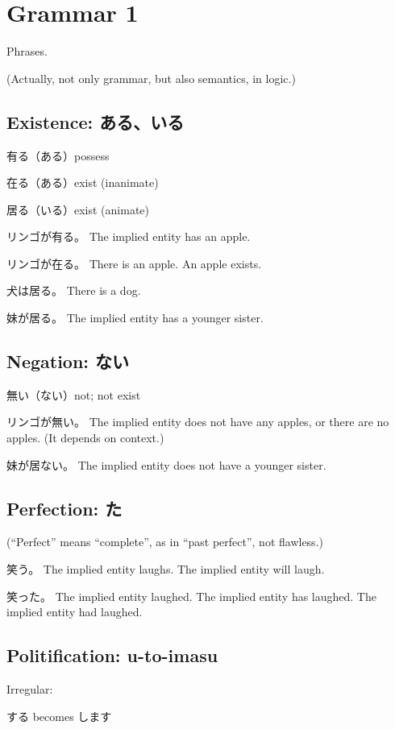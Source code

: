 \chapter{Grammar 1}

Phrases.

(Actually, not only grammar, but also semantics, in logic.)

\section{Existence: ある、いる}

有る（ある）possess

在る（ある）exist (inanimate)

居る（いる）exist (animate)

リンゴが有る。
The implied entity has an apple.

リンゴが在る。
There is an apple.
An apple exists.

犬は居る。
There is a dog.

妹が居る。
The implied entity has a younger sister.

\section{Negation: ない}

無い（ない）not; not exist

リンゴが無い。
The implied entity does not have any apples,
or there are no apples.
(It depends on context.)

妹が居ない。
The implied entity does not have a younger sister.

\section{Perfection: た}

(``Perfect'' means ``complete'', as in ``past perfect'', not flawless.)

笑う。
The implied entity laughs.
The implied entity will laugh.

笑った。
The implied entity laughed.
The implied entity has laughed.
The implied entity had laughed.

\section{Politification: u-to-imasu}

Irregular:

する becomes します

